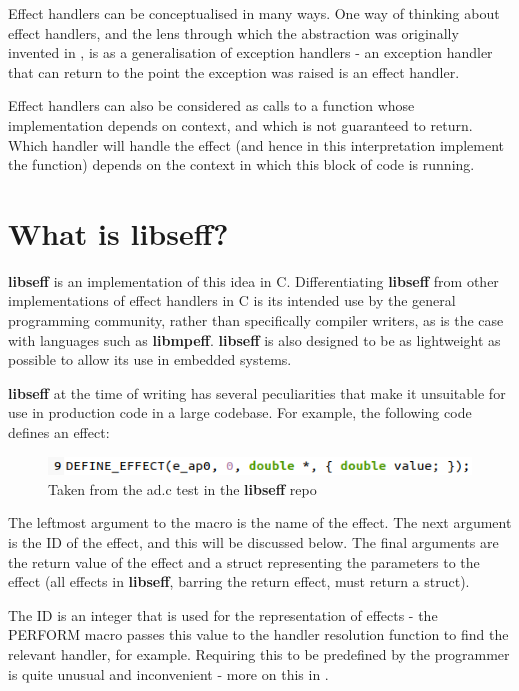 \documentclass[logo,bsc,singlespacing,parskip,online]{infthesis}
\begin{document}
Effect handlers can be conceptualised in many ways. One way of thinking about effect handlers, and the lens through which the abstraction was originally invented in \cite{og-paper}, is as a generalisation of exception handlers - an exception handler that can return to the point the exception was raised is an effect handler. \citep{ocaml-paper}

Effect handlers can also be considered as calls to a function whose implementation depends on context, and which is not guaranteed to return. Which handler will handle the effect (and hence in this interpretation implement the function) depends on the context in which this block of code is running. \citep{award-paper}

\section{What is libseff?}

\textbf{libseff} is an implementation of this idea in C. Differentiating \textbf{libseff} from other implementations of effect handlers in C is its intended use by the general programming community, rather than specifically compiler writers, as is the case with languages such as \textbf{libmpeff}. \citep{libseff_paper} \citep{libmprompt} \textbf{libseff} is also designed to be as lightweight as possible to allow its use in embedded systems. \citep{libseff_paper}

\textbf{libseff} at the time of writing has several peculiarities that make it unsuitable for use in production code in a large codebase. For example, the following code defines an effect: 
\begin{figure}[ht]
    \centering
    \includegraphics[width=0.9\linewidth]{eff_def.png}
    \caption{Taken from the ad.c test in the \textbf{libseff} repo}
\end{figure}

The leftmost argument to the macro is the name of the effect. The next argument is the ID of the effect, and this will be discussed below. The final arguments are the return value of the effect and a struct representing the parameters to the effect (all effects in \textbf{libseff}, barring the return effect, must return a struct).

The ID is an integer that is used for the representation of effects - the PERFORM macro passes this value to the handler resolution function to find the relevant handler, for example. Requiring this to be predefined by the programmer is quite unusual and inconvenient - more on this in .
\end{document}

